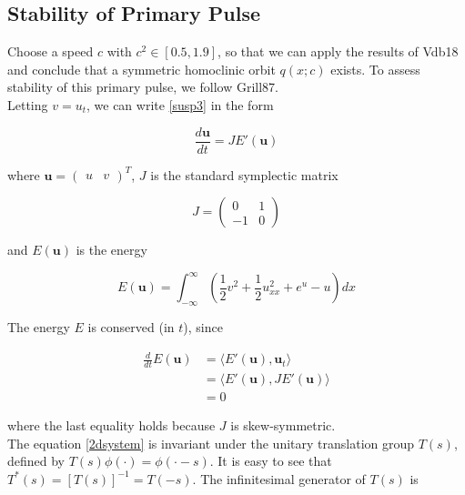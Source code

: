 \documentclass[12pt]{article}
\begin{document}
\subsection{Stability of Primary Pulse}

Choose a speed $c$ with $c^2 \in [0.5, 1.9]$, so that we can apply the results of Vdb18 and conclude that a symmetric homoclinic orbit $q(x; c)$ exists. To assess stability of this primary pulse, we follow Grill87.\\

Letting $v = u_t$, we can write \eqref{susp3} in the form 

\begin{equation}\label{2dsystem}
\frac{d \textbf{u} }{dt} = J E'(\textbf{u})
\end{equation}

where $\textbf{u} = \begin{pmatrix}u&v\end{pmatrix}^T$, $J$ is the standard symplectic matrix

\begin{equation*}
J = \begin{pmatrix}0 & 1 \\ -1 & 0 \end{pmatrix}
\end{equation*}

and $E(\textbf{u})$ is the energy

\begin{equation}\label{energy}
E(\textbf{u}) = \int_{-\infty}^\infty \left(\frac{1}{2} v^2 + \frac{1}{2}u_{xx}^2 + e^{u} - u \right)dx
\end{equation}

The energy $E$ is conserved (in $t$), since

\begin{align*}
\frac{d}{dt} E(\textbf{u}) &= \langle E'(\textbf{u}), \textbf{u}_t \rangle \\
&= \langle E'(\textbf{u}), J E'(\textbf{u}) \rangle \\
&= 0
\end{align*}

where the last equality holds because $J$ is skew-symmetric.\\

The equation \eqref{2dsystem} is invariant under the unitary translation group $T(s)$, defined by $T(s)\phi(\cdot) = \phi(\cdot - s)$. It is easy to see that $T^*(s) = [T(s)]^{-1} = T(-s)$. The infinitesimal generator of $T(s)$ is
\end{document}
